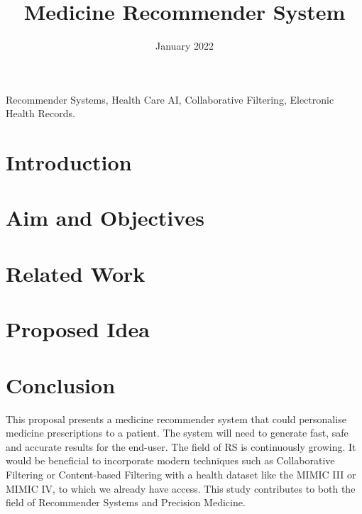\documentclass[conference]{IEEEtran}
\begin{document}
\title{Medicine Recommender System}

\author{
	\date{January 2022}
}

\maketitle

\begin{abstract}
    
\end{abstract}

\begin{IEEEkeywords}
    Recommender Systems, Health Care AI, Collaborative Filtering,
    Electronic Health Records.
\end{IEEEkeywords}

\section{Introduction}
    

\section{Aim and Objectives}
    


\section{Related Work}
    

\section{Proposed Idea}
    

\section{Conclusion}

This proposal presents a medicine recommender system that could
personalise medicine prescriptions to a patient. The system will need
to generate fast, safe and accurate results for the end-user. The field of
RS is continuously growing. It would be beneficial to incorporate 
modern techniques such as Collaborative Filtering or Content-based Filtering
with a health dataset like the MIMIC III or MIMIC IV, to which we
already have access. This study contributes to both the field of
Recommender Systems and Precision Medicine.



\end{document}
